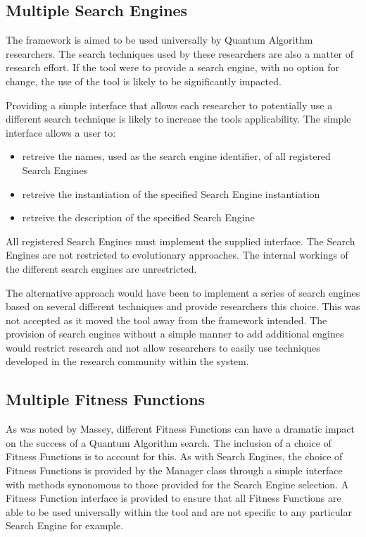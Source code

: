 \documentclass[authoryearcitations]{UoYCSproject}
\begin{document}
\subsection{Multiple Search Engines}
The framework is aimed to be used universally by Quantum Algorithm researchers.
The search techniques used by these researchers are also a matter of research effort.
If the tool were to provide a search engine, with no option for change, the use of the tool is likely to be significantly impacted.

Providing a simple interface that allows each researcher to potentially use a different search technique is likely to increase the tools applicability.
The simple interface allows a user to:
\begin{itemize}
 \item retreive the names, used as the search engine identifier, of all registered Search Engines
 \item retreive the instantiation of the specified Search Engine instantiation
 \item retreive the description of the specified Search Engine
\end{itemize}

All registered Search Engines must implement the supplied interface.
The Search Engines are not restricted to evolutionary approaches.
The internal workings of the different search engines are unrestricted.

The alternative approach would have been to implement a series of search engines based on several different techniques and provide researchers this choice.
This was not accepted as it moved the tool away from the framework intended.
The provision of search engines without a simple manner to add additional engines would restrict research and not allow researchers to easily use techniques developed in the research community within the system.

\subsection{Multiple Fitness Functions}
As was noted by Massey\cite{masseythesis}, different Fitness Functions can have a dramatic impact on the success of a Quantum Algorithm search.
The inclusion of a choice of Fitness Functions is to account for this.
As with Search Engines, the choice of Fitness Functions is provided by the Manager class through a simple interface with methods synonomous to those provided for the Search Engine selection.
A Fitness Function interface is provided to ensure that all Fitness Functions are able to be used universally within the tool and are not specific to any particular Search Engine for example.
\end{document}
